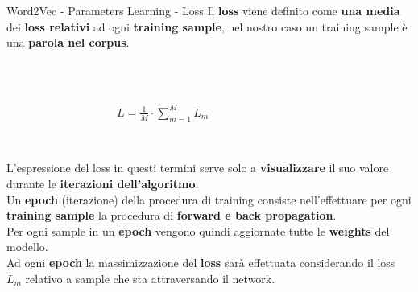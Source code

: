 \documentclass[british]{beamer}
\begin{document}
\begin{frame}{Word2Vec - Parameters Learning - Loss}
	Il \textbf{loss} viene definito come \textbf{una media} dei \textbf{loss relativi} ad ogni \textbf{training sample}, nel nostro caso un training sample \`{e} una \textbf{parola nel corpus}.\\
	\begin{columns}
		\begin{column}{0.3\textwidth}
			
		\end{column}
		\begin{column}{0.4\textwidth}
			\\~\\
			\(L = \frac{1}{M} \cdot \sum_{m=1}^{M} L_m\)
			\\~\\
		\end{column}
		\begin{column}{0.3\textwidth}
			
		\end{column}
	\end{columns}
	L'espressione del loss in questi termini serve solo a \textbf{visualizzare} il suo valore durante le \textbf{iterazioni dell'algoritmo}.\\
	Un \textbf{epoch} (iterazione) della procedura di training consiste nell'effettuare per ogni \textbf{training sample} la procedura di \textbf{forward e back propagation}.\\
	Per ogni sample in un \textbf{epoch} vengono quindi aggiornate tutte le \textbf{weights} del modello.\\
	Ad ogni \textbf{epoch} la massimizzazione del \textbf{loss} sar\`{a} effettuata considerando il loss \(L_m\) relativo a sample che sta attraversando il network. 
	
\end{frame}
\end{document}
